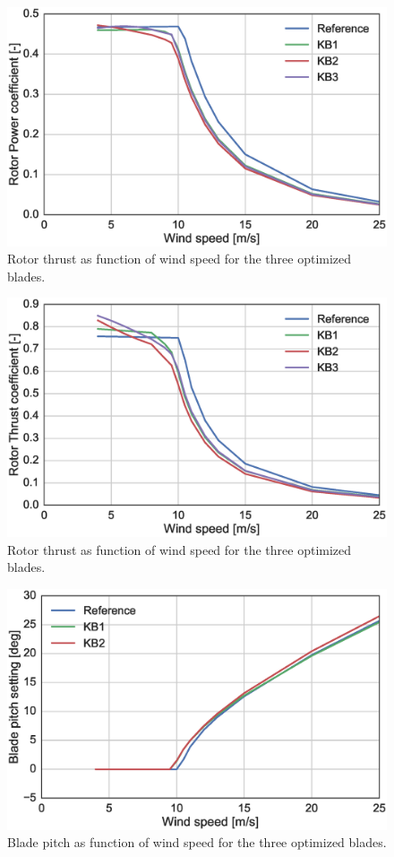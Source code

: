 \begin{figure}[!ht]
\begin{center}
	\includegraphics[width=.85\linewidth]{figures/KB_power_coefficient.eps}
\end{center}
\caption{Rotor thrust as function of wind speed for the three optimized blades.}
\label{fig:cp}
\end{figure}

\begin{figure}[!ht]
\begin{center}
	\includegraphics[width=.85\linewidth]{figures/KB_thrust_coefficient.eps}
\end{center}
\caption{Rotor thrust as function of wind speed for the three optimized blades.}
\label{fig:ct}
\end{figure}

\begin{figure}[!ht]
\begin{center}
	\includegraphics[width=.85\linewidth]{figures/KB_pitch.eps}
\end{center}
\caption{Blade pitch as function of wind speed for the three optimized blades.}
\label{fig:pitch}
\end{figure}

